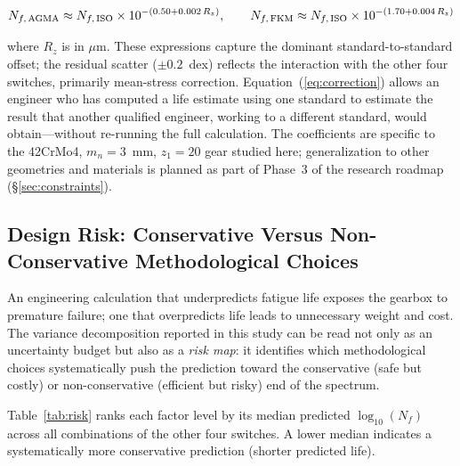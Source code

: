 \documentclass[12pt,a4paper]{article}
\begin{document}
\begin{equation}
N_{f,\,{\rm AGMA}} \approx N_{f,\,{\rm ISO}} \times 10^{-(0.50 + 0.002\,R_z)},
\qquad
N_{f,\,{\rm FKM}}  \approx N_{f,\,{\rm ISO}} \times 10^{-(1.70 + 0.004\,R_z)}
\label{eq:correction}
\end{equation}

where $R_z$ is in $\mu$m. These expressions capture the dominant
standard-to-standard offset; the residual scatter ($\pm 0.2$~dex)
reflects the interaction with the other four switches, primarily
mean-stress correction. Equation~(\ref{eq:correction}) allows an
engineer who has computed a life estimate using one standard to
estimate the result that another qualified engineer, working to a
different standard, would obtain---without re-running the full
calculation. The coefficients are specific to the 42CrMo4, $m_n=3$~mm,
$z_1=20$ gear studied here; generalization to other geometries and
materials is planned as part of Phase~3 of the research roadmap
(\S\ref{sec:constraints}).

\subsection{Design Risk: Conservative Versus Non-Conservative Methodological Choices}

An engineering calculation that underpredicts fatigue life exposes the
gearbox to premature failure; one that overpredicts life leads to
unnecessary weight and cost. The variance decomposition reported in
this study can be read not only as an uncertainty budget but also as a
\emph{risk map}: it identifies which methodological choices
systematically push the prediction toward the conservative (safe but
costly) or non-conservative (efficient but risky) end of the spectrum.

Table~\ref{tab:risk} ranks each factor level by its median predicted
$\log_{10}(N_f)$ across all combinations of the other four switches.
A lower median indicates a systematically more conservative prediction
(shorter predicted life).
\end{document}

